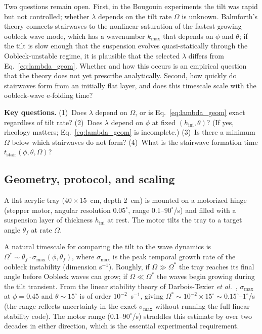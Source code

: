 \documentclass[aps,preprint,superscriptaddress,longbibliography]{revtex4-2}
\begin{document}
Two questions remain open.  First, in the Bougouin experiments the tilt was
rapid but not controlled; whether $\lambda$ depends on the tilt rate $\Omega$
is unknown.  Balmforth's theory connects stairwaves to the nonlinear saturation
of the fastest-growing oobleck wave mode, which has a wavenumber $k_\text{max}$
that depends on $\phi$ and $\theta$; if the tilt is slow enough that the
suspension evolves quasi-statically through the Oobleck-unstable regime, it is
plausible that the selected $\lambda$ differs from Eq.~\eqref{eq:lambda_geom}.
Whether and how this occurs is an empirical question that the theory does not
yet prescribe analytically.  Second, how quickly do stairwaves form from an
initially flat layer, and does this timescale scale with the oobleck-wave
e-folding time?

\begin{mdframed}[style=questionbox]
\textbf{Key questions.}
(1)~Does $\lambda$ depend on $\Omega$, or is Eq.~\eqref{eq:lambda_geom} exact
regardless of tilt rate?
(2)~Does $\lambda$ depend on $\phi$ at fixed $(h_\text{ini}, \theta)$?
(If yes, rheology matters; Eq.~\eqref{eq:lambda_geom} is incomplete.)
(3)~Is there a minimum $\Omega$ below which stairwaves do not form?
(4)~What is the stairwave formation time $t_\text{stair}(\phi, \theta, \Omega)$?
\end{mdframed}

\subsection{Geometry, protocol, and scaling}

A flat acrylic tray ($40 \times 15$~cm, depth 2~cm) is mounted on a motorized
hinge (stepper motor, angular resolution $0.05^\circ$, range 0.1--$90^\circ$/s)
and filled with a suspension layer of thickness $h_\text{ini}$ at rest.  The
motor tilts the tray to a target angle $\theta_f$ at rate $\Omega$.

A natural timescale for comparing the tilt to the wave dynamics is
$\Omega^* \sim \theta_f \cdot \sigma_\text{max}(\phi, \theta_f)$, where
$\sigma_\text{max}$ is the peak temporal growth rate of the oobleck instability
(dimension s$^{-1}$).  Roughly, if $\Omega \gg \Omega^*$ the tray reaches its
final angle before Oobleck waves can grow; if $\Omega \ll \Omega^*$ the waves
begin growing during the tilt transient.  From the linear stability theory of
Darbois-Texier \textit{et al.}~\cite{DarboisTexier2023}, $\sigma_\text{max}$ at
$\phi = 0.45$ and $\theta \sim 15^\circ$ is of order $10^{-2}$~s$^{-1}$, giving
$\Omega^* \sim 10^{-2} \times 15^\circ \sim 0.15^\circ$--$1^\circ$/s (the
range reflects uncertainty in the exact $\sigma_\text{max}$ without running the
full linear stability code).  The motor range (0.1--$90^\circ$/s) straddles
this estimate by over two decades in either direction, which is the essential
experimental requirement.
\end{document}
